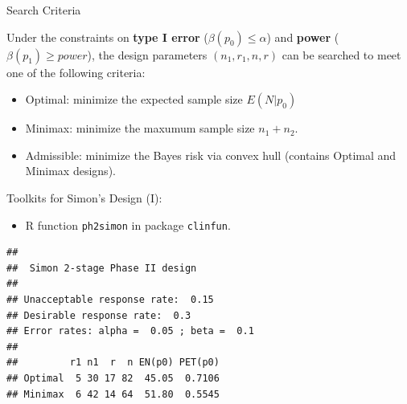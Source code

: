\begin{frame}{Search Criteria}

Under the constraints on \textbf{type I error}
(\(\beta(p_0)\le \alpha\)) and \textbf{power}
(\(\beta(p_1) \ge power\)), the design parameters \((n_1, r_1, n, r)\)
can be searched to meet one of the following criteria:

\begin{itemize}[<+->]
\tightlist
\item
  Optimal: minimize the expected sample size \(E(N|p_0)\)
\item
  Minimax: minimize the maxumum sample size \(n_1+n_2\).
\item
  Admissible: minimize the Bayes risk via convex hull (contains Optimal
  and Minimax designs).
\end{itemize}

\end{frame}

\begin{frame}[fragile]{Toolkits for Simon's Design (I):}

\begin{itemize}
\tightlist
\item
  R function \texttt{ph2simon} in package \texttt{clinfun}.
\end{itemize}

\begin{Shaded}
\begin{Highlighting}[]
\NormalTok{(}\NormalTok{, }\NormalTok{, } \NormalTok{, }\NormalTok{, } \NormalTok{)}
\end{Highlighting}
\end{Shaded}

\begin{verbatim}
## 
##  Simon 2-stage Phase II design 
## 
## Unacceptable response rate:  0.15 
## Desirable response rate:  0.3 
## Error rates: alpha =  0.05 ; beta =  0.1 
## 
##         r1 n1  r  n EN(p0) PET(p0)
## Optimal  5 30 17 82  45.05  0.7106
## Minimax  6 42 14 64  51.80  0.5545
\end{verbatim}

\end{frame}

